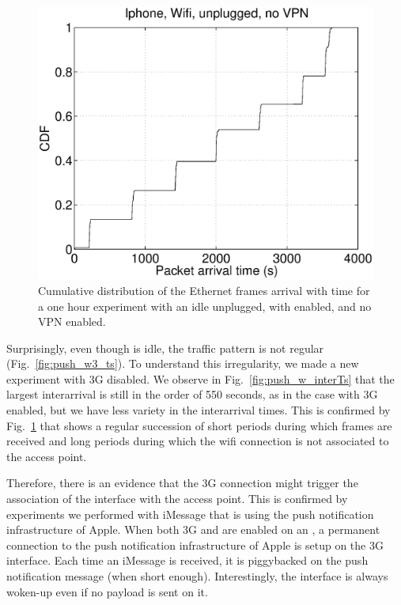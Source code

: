 
\begin{figure}
\centering
        \includegraphics[width=0.8\linewidth]{../../code/pushNotification/Fig/bw_iphone_wifi_unplug_novpn_ts.eps}
  \caption{Cumulative distribution of the Ethernet frames
          arrival with time for a one hour experiment with an idle
          \iphone{} unplugged, with \wifi{} enabled, and no VPN
          enabled.}
  \label{fig:push_w_ts}
\end{figure}

Surprisingly, even though \iphone{} is idle, the traffic pattern
is not regular (Fig.~\ref{fig:push_w3_ts}). To
understand this irregularity, we made a new experiment with 3G
disabled. We observe in Fig.~\ref{fig:push_w_interTs} that the largest
interarrival is still in the order of 550 seconds, as in the case with
3G enabled, but we have less variety in the interarrival times. This
is confirmed by Fig.~\ref{fig:push_w_ts} that shows a regular
succession of short periods during which frames are received and long
periods during which the wifi connection is not associated to the
access point.

Therefore, there is an evidence that the 3G connection might trigger
the association of the \iphone{} \wifi interface with the access
point. This is confirmed by experiments we performed with iMessage
that is using the push notification infrastructure of Apple. When both
3G and \wifi{} are enabled on an \iphone{}, a permanent connection to
the push notification infrastructure of Apple is setup on the 3G
interface. Each time an iMessage is received, it is piggybacked on the
push notification message (when short enough). Interestingly, the \wifi{}
interface is always woken-up even if no payload is sent on it. 

